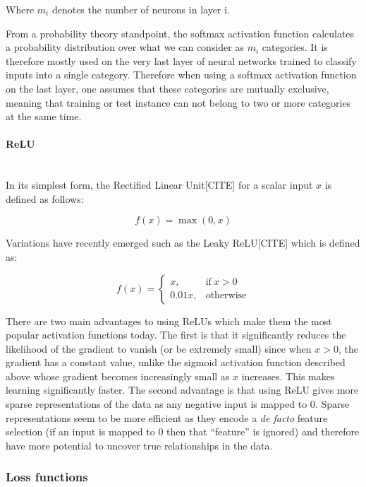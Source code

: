 \documentclass[12pt,twoside]{article}
\newcommand{\para}[1]{\paragraph{#1}\mbox{}\\}
\begin{document}
Where $m_i$ denotes the number of neurons in layer i.

From a probability theory standpoint, the softmax activation function
calculates a probability distribution over what we can consider as $m_i$
categories. It is therefore mostly used on the very last layer of neural
networks trained to classify inputs into a single category. Therefore when
using a softmax activation function on the last layer, one assumes that these
categories are mutually exclusive, meaning that training or test instance can
not belong to two or more categories at the same time.

\para{ReLU}\label{para:relu}
In its simplest form, the Rectified Linear Unit[CITE] for a scalar input $x$ is defined as
follows:

\begin{equation}
  f(x) = \max(0,x)
  \label{eq:relu}
\end{equation}

Variations have recently emerged such as the Leaky ReLU[CITE] which is defined
as:

\begin{equation}
  f(x) = 
  \begin{cases}
    x, & \text{if}\ x >0\\
    0.01x, & \text{otherwise}
  \end{cases}
  \label{eq:leaky_relu}
\end{equation}

There are two main advantages to using ReLUs which make them the most popular
activation functions today. The first is that it significantly reduces the
likelihood of the gradient to vanish (or be extremely small) since when
$x >0$, the gradient has a constant value, unlike the sigmoid activation
function described above whose gradient becomes increasingly small as
$x$ increases. This makes learning significantly faster. The second advantage
is that using ReLU gives more sparse representations of the data as any
negative input is mapped to $0$. Sparse representations seem to be more
efficient as they encode a \textit{de facto} feature selection (if an input is
mapped to 0 then that ``feature'' is ignored) and therefore
have more potential to uncover true relationships in the data.

\subsubsection{Loss functions}\label{sec:loss}
\end{document}
